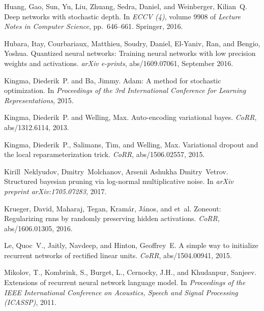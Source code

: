 \documentclass{article}
\begin{document}
\begin{thebibliography}{30}
Huang, Gao, Sun, Yu, Liu, Zhuang, Sedra, Daniel, and Weinberger, Kilian~Q.
\newblock Deep networks with stochastic depth.
\newblock In \emph{ECCV (4)}, volume 9908 of \emph{Lecture Notes in Computer
  Science}, pp.\  646--661. Springer, 2016.

Hubara, Itay, Courbariaux, Matthieu, Soudry, Daniel, El-Yaniv, Ran, and Bengio,
  Yoshua.
\newblock Quantized neural networks: Training neural networks with low
  precision weights and activations.
\newblock \emph{arXiv e-prints}, abs/1609.07061, September 2016.

Kingma, Diederik~P. and Ba, Jimmy.
\newblock Adam: {A} method for stochastic optimization.
\newblock In \emph{Proceedings of the 3rd International Conference for Learning
  Representations}, 2015.

Kingma, Diederik~P. and Welling, Max.
\newblock Auto-encoding variational bayes.
\newblock \emph{CoRR}, abs/1312.6114, 2013.

Kingma, Diederik~P., Salimans, Tim, and Welling, Max.
\newblock Variational dropout and the local reparameterization trick.
\newblock \emph{CoRR}, abs/1506.02557, 2015.

Kirill~Neklyudov, Dmitry~Molchanov, Arsenii Ashukha Dmitry~Vetrov.
\newblock Structured bayesian pruning via log-normal multiplicative noise.
\newblock In \emph{arXiv preprint arXiv:1705.07283}, 2017.

Krueger, David, Maharaj, Tegan, Kram{\'{a}}r, J{\'{a}}nos, and et~al.
\newblock Zoneout: Regularizing rnns by randomly preserving hidden activations.
\newblock \emph{CoRR}, abs/1606.01305, 2016.

Le, Quoc~V., Jaitly, Navdeep, and Hinton, Geoffrey~E.
\newblock A simple way to initialize recurrent networks of rectified linear
  units.
\newblock \emph{CoRR}, abs/1504.00941, 2015.

Mikolov, T., Kombrink, S., Burget, L., Cernocky, J.H., and Khudanpur, Sanjeev.
\newblock Extensions of recurrent neural network language model.
\newblock In \emph{Proceedings of the IEEE International Conference on
  Acoustics, Speech and Signal Processing (ICASSP)}, 2011.


\end{thebibliography}
\end{document}
